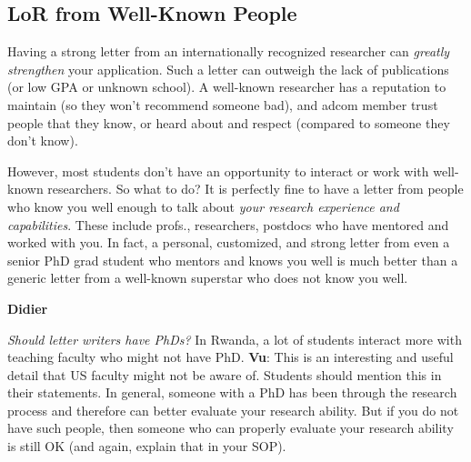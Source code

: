 \documentclass[oneside,11pt,dvipsnames]{book}
\newenvironment{commentbox}[1][]{
  \small
  \begin{mybox}
    {\small \textbf{#1}}
  }{
  \end{mybox}
}
\begin{document}
\subsection{LoR from Well-Known People}  Having a strong letter from an internationally recognized researcher can \emph{greatly strengthen} your application. Such a letter can outweigh the lack of publications (or low GPA or unknown school). A well-known researcher has a reputation to maintain (so they won't recommend someone bad), and adcom member trust people that they know, or heard about and respect (compared to someone they don't know).



However, most students don't have an opportunity to interact or work with well-known researchers.  
So what to do? It is perfectly fine to have a letter from people who know you well enough to talk about \emph{your research experience and capabilities}. These include profs., researchers, postdocs who have mentored and worked with you. In fact, a personal, customized, and strong letter from even a senior PhD grad student who mentors and knows you well is much better than a generic letter from a well-known superstar who does not know you well. 



\begin{commentbox}[Didier]
    \emph{Should letter writers have PhDs?}  In Rwanda, a lot of students interact more with teaching faculty who might not have PhD.
    \tcblower
    \textbf{Vu}: This is an interesting and useful detail that US faculty might not be aware of. Students should mention this in their statements. In general, someone with a PhD has been through the research process and therefore can better evaluate your research ability.  But if you do not have such people, then someone who can properly evaluate your research ability is still OK (and again, explain that in your SOP).
  \end{commentbox}
\end{document}
